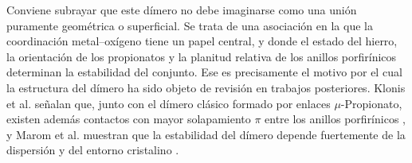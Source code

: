 \documentclass[12pt,letterpaper,oneside]{report}
\begin{document}

Conviene subrayar que este dímero no debe imaginarse como una unión puramente geométrica o superficial. Se trata de una asociación en la que la coordinación metal–oxígeno tiene un papel central, y donde el estado del hierro, la orientación de los propionatos y la planitud relativa de los anillos porfirínicos determinan la estabilidad del conjunto. Ese es precisamente el motivo por el cual la estructura del dímero ha sido objeto de revisión en trabajos posteriores. Klonis et al. señalan que, junto con el dímero clásico formado por enlaces $\mu$-Propionato, existen además contactos con mayor solapamiento $\pi$ entre los anillos porfirínicos \cite{Klonis2010}, y Marom et al. muestran que la estabilidad del dímero depende fuertemente de la dispersión y del entorno cristalino \cite{Marom2011}.\\


\end{document}
